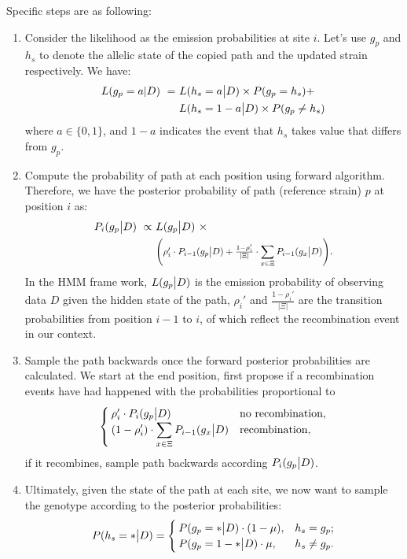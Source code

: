 \documentclass{bioinfo}
\newcommand*{\Scale}[2][4]{\scalebox{#1}{$#2$}}%
\begin{document}
Specific steps are as following:
\begin{enumerate}
\item Consider the likelihood as the emission probabilities at site $i$. Let's use $g_p$ and $h_s$ to denote the allelic state of the copied path and the updated strain respectively. We have:
\begin{equation*}
\begin{split}
L(g_p = a | D) ~ = ~ & L(h_s = a \big{|} D) \times P(g_p = h_s) + \\
                     & L(h_s = 1 - a \big{|} D) \times P(g_p \neq h_s) \label{eqn:gp_given_D}
\end{split}
\end{equation*}
where $a\in \{0,1\}$, and $1-a$ indicates the event that $h_s$ takes value that differs from $g_p$.

\item Compute the probability of path at each position using forward algorithm. Therefore, we have the posterior probability of path (reference strain) $p$ at position $i$ as:
\begin{equation}
\begin{split}
P_i(g_p \big{|} D) ~ \propto ~ & L(g_p \big{|} D) ~ \times \\
                               & \Scale[0.85]{\left( \rho_i' \cdot P_{i-1}(g_p \big{|} D)  +  \frac{1-\rho_i'}{|\Xi|} \cdot \displaystyle\sum_{x\in \Xi} P_{i-1} (g_x \big{|} D) \right)}.
\end{split}\label{eqn:post_path}
\end{equation}
In the HMM frame work, $L(g_p \big{|} D)$ is the emission probability of observing data $D$ given the hidden state of the path, $\rho_i'$ and $\frac{1-\rho_i'}{|\Xi|}$ are the transition probabilities from position $i-1$ to $i$, of which reflect the recombination event in our context.

\item Sample the path backwards once the forward posterior probabilities are calculated. We start at the end position, first propose if a recombination events have had happened with the probabilities proportional to
$$
\begin{cases}
\rho_i' \cdot P_i(g_p \big{|} D) & \text{no recombination},\\
\displaystyle ( 1-\rho_i' ) \cdot \sum_{x\in \Xi} P_{i-1}(g_x \big{|} D) & \text{recombination},
\end{cases}
$$
if it recombines, sample path backwards according $P_i(g_p \big{|} D)$.

\item Ultimately, given the state of the path at each site, we now want to sample the genotype according to the posterior probabilities:
\begin{equation}
P(h_{s} = * \big{|} D) =
\begin{cases}
P(g_{p} = * \big{|} D) \cdot (1-\mu), & h_s = g_p;\\
P(g_{p} = 1 - * \big{|} D) \cdot \mu, & h_s \neq g_p.
\end{cases}
\label{eqn:ps0}
\end{equation}

\end{enumerate}
\end{document}
